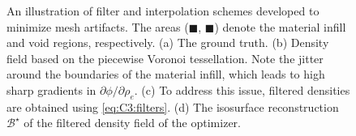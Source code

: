 \begin{figure}[!t]
  \centering
  \vspace{-2mm}
  
  \caption{\small An illustration of filter and interpolation schemes developed to minimize mesh artifacts. The areas (\textcolor{matinfil}{$\blacksquare$}, \textcolor{lightvoid}{$\blacksquare$}) denote the material infill and void regions, respectively. (a) The ground truth. (b) Density field based on the piecewise Voronoi tessellation. Note the jitter around the boundaries of the material infill, which leads to high sharp gradients in ${\partial \phi}/{\partial \rho_e}$. (c) To address this issue, filtered densities are obtained using \eqref{eq:C3:filters}. (d) The isosurface reconstruction $\mathcal{B}^\star$ of the filtered density field of the optimizer.}
  \label{fig:C3:topo_filtering}
\end{figure}

